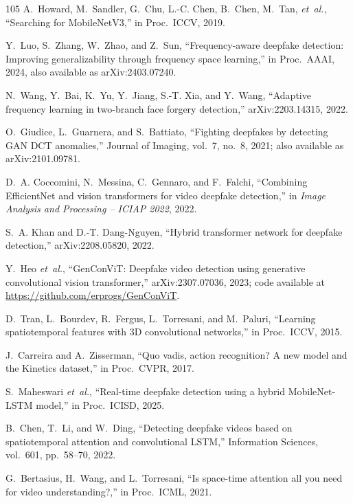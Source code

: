 \begin{thebibliography}{105}
A.~Howard, M.~Sandler, G.~Chu, L.-C. Chen, B.~Chen, M.~Tan, \emph{et~al.}, ``Searching for MobileNetV3,'' in Proc.\ ICCV, 2019.

Y.~Luo, S.~Zhang, W.~Zhao, and Z.~Sun, ``Frequency-aware deepfake detection: Improving generalizability through frequency space learning,'' in Proc.\ AAAI, 2024, also available as arXiv:2403.07240.

N.~Wang, Y.~Bai, K.~Yu, Y.~Jiang, S.-T. Xia, and Y.~Wang, ``Adaptive frequency learning in two-branch face forgery detection,'' arXiv:2203.14315, 2022.

O.~Giudice, L.~Guarnera, and S.~Battiato, ``Fighting deepfakes by detecting GAN DCT anomalies,'' Journal of Imaging, vol.~7, no.~8, 2021; also available as arXiv:2101.09781.

D.~A. Coccomini, N.~Messina, C.~Gennaro, and F.~Falchi, ``Combining EfficientNet and vision transformers for video deepfake detection,'' in \emph{Image Analysis and Processing -- ICIAP 2022}, 2022.

S.~A. Khan and D.-T. Dang-Nguyen, ``Hybrid transformer network for deepfake detection,'' arXiv:2208.05820, 2022.

Y.~Heo \emph{et~al.}, ``GenConViT: Deepfake video detection using generative convolutional vision transformer,'' arXiv:2307.07036, 2023; code available at \url{https://github.com/erprogs/GenConViT}.

D.~Tran, L.~Bourdev, R.~Fergus, L.~Torresani, and M.~Paluri, ``Learning spatiotemporal features with 3D convolutional networks,'' in Proc.\ ICCV, 2015.

J.~Carreira and A.~Zisserman, ``Quo vadis, action recognition? A new model and the Kinetics dataset,'' in Proc.\ CVPR, 2017.

S.~Maheswari \emph{et~al.}, ``Real-time deepfake detection using a hybrid MobileNet-LSTM model,'' in Proc.\ ICISD, 2025.

B.~Chen, T.~Li, and W.~Ding, ``Detecting deepfake videos based on spatiotemporal attention and convolutional LSTM,'' Information Sciences, vol.~601, pp.~58--70, 2022.

G.~Bertasius, H.~Wang, and L.~Torresani, ``Is space-time attention all you need for video understanding?,'' in Proc.\ ICML, 2021.


\end{thebibliography}
